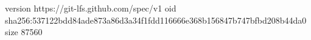 version https://git-lfs.github.com/spec/v1
oid sha256:537122bdd84ade873a86d3a34f1fdd116666e368b156847b747bfbd208b44da0
size 87560
